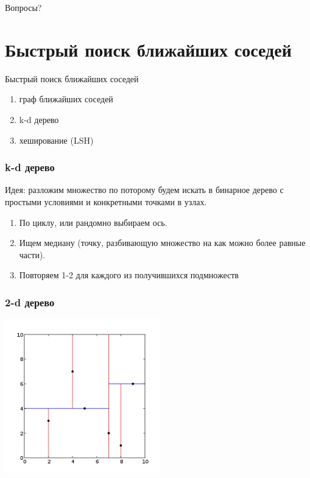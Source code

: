 \documentclass[10pt]{beamer}
\begin{document}
\begin{frame}[standout]
  Вопросы?
\end{frame}

\appendix

\section{Быстрый поиск ближайших соседей}

\begin{frame}{Быстрый поиск ближайших соседей}
	\begin{enumerate} [--]
		\item граф ближайших соседей
		\item k-d дерево
		\item хеширование (LSH)
	\end{enumerate}
\end{frame}

\begin{frame}\frametitle{k-d дерево}
	\alert{Идея}: разложим множество по поторому будем искать в бинарное дерево с простыми условиями и конкретными точками в узлах.
	\bigbreak
	\uncover<2,3> {
	\begin{enumerate}
		\item По циклу, или рандомно выбираем ось.
		\item Ищем медиану (точку, разбивающую множество на как можно более равные части).
		\item Повторяем 1-2 для каждого из получившихся подмножеств 
	\end{enumerate}
	}
\end{frame}

\begin{frame}\frametitle{2-d дерево}
	\begin{center}
    	\includegraphics[height=190pt]{images/Kdtree_2d}  	
	\end{center}
\end{frame}
\end{document}
